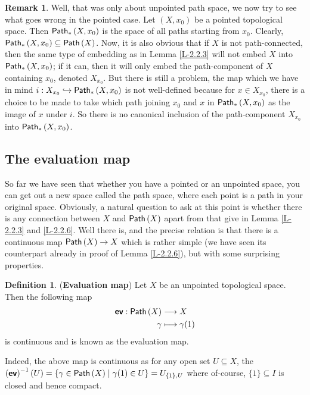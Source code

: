 \documentclass[letterpaper,11pt,twoside]{article}
\theoremstyle{definition}
\theoremstyle{definition}
\newtheorem{definition}[proposition]{Definition}
\theoremstyle{definition}
\newtheorem{remark}[proposition]{\textbf{Remark}}
\theoremstyle{definition}
\theoremstyle{definition}
\theoremstyle{definition}
\theoremstyle{remark}
\theoremstyle{definition}
\newcommand{\inv}[1]{\left(#1\right)^{-1}}
\newcommand{\upps}[1]{{\fontfamily{lmss}\selectfont 
		\text{Path}\left(#1\right)
}}
\newcommand{\pps}[1]{{\fontfamily{lmss}\selectfont 
		\text{Path}_{*}\left(#1\right)
}}
\newcommand{\ev}[0]{{\fontfamily{lmss}\selectfont 
        \textbf{ev}
}}
\begin{document}
    \begin{remark}
    Well, that was only about unpointed path space, we now try to see what goes wrong in the pointed case. Let $(X,x_0)$ be a pointed topological space. Then $\pps{X,x_0}$ is the space of all paths starting from $x_0$. Clearly, $\pps{X,x_0} \subseteq \upps{X}$. Now, it is also obvious that if $X$ is not path-connected, then the same type of embedding as in Lemma \ref{L-2.2.3} will not embed $X$ into $\pps{X,x_0}$; if it can, then it will only embed the path-component of $X$ containing $x_0$, denoted $X_{x_0}$. But there is still a problem, the map which we have in mind $i :X_{x_0} \hookrightarrow \pps{X,x_0}$ is not well-defined because for $x\in X_{x_0}$, there is a choice to be made to take which path joining $x_0 $ and $x$ in $\pps{X,x_0}$ as the image of $x$ under $i$. So there is no canonical inclusion of the path-component $X_{x_0}$ into $\pps{X,x_0}$. 
    \end{remark}
    \subsection{The evaluation map}
    So far we have seen that whether you have a pointed or an unpointed space, you can get out a new space called the path space, where each point is a path in your original space. Obviously, a natural question to ask at this point is whether there is any connection between $X$ and $\upps{X}$ apart from that give in Lemma \ref{L-2.2.3} and \ref{L-2.2.6}. Well there is, and the precise relation is that there is a continuous map $\upps{X} \to X$ which is rather simple (we have seen its counterpart already in proof of Lemma \ref{L-2.2.6}), but with some surprising properties.
    \begin{definition}
    (\textbf{Evaluation map}) Let $X$ be an unpointed topological space. Then the following map
    \begin{align*}
        \ev : \upps{X}&\longrightarrow X\\
                \gamma &\longmapsto \gamma(1)
    \end{align*}    
    is continuous and is known as the evaluation map.
    \end{definition}
    Indeed, the above map is continuous as for any open set $U\subseteq X$, the $\inv{\ev}(U) = \{\gamma \in \upps{X}\;\vert\; \gamma(1) \in U\} = U_{\{1\},U}$ where of-course, $\{1\} \subseteq I$ is closed and hence compact.\\
    
\end{document}
